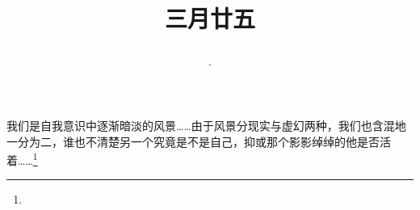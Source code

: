 \title{\date[d=3,m=5,y=2024][year:cn-y,年,month:cn,day:cn,日,·,weekday]·三月廿五 }
我们是自我意识中逐渐暗淡的风景……由于风景分现实与虚幻两种，我们也含混地一分为二，谁也不清楚另一个究竟是不是自己，抑或那个影影绰绰的他是否活着……\footnote{ }

